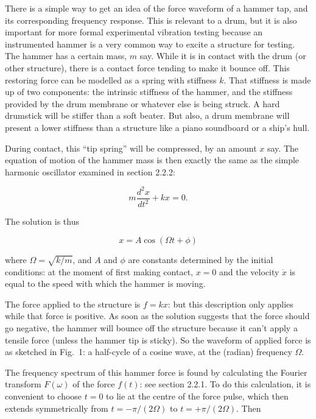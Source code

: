   There is a simple way to get an idea of the force waveform of a hammer tap, 
  and its corresponding frequency response. This is relevant to a drum, but it 
  is also important for more formal experimental vibration testing because an 
  instrumented hammer is a very common way to excite a structure for testing. 
  The hammer has a certain mass, $m$ say. While it is in contact with the drum 
  (or other structure), there is a contact force tending to make it bounce off. 
  This restoring force can be modelled as a spring with stiffness $k$. That 
  stiffness is made up of two components: the intrinsic stiffness of the 
  hammer, and the stiffness provided by the drum membrane or whatever else is 
  being struck. A hard drumstick will be stiffer than a soft beater. But also, 
  a drum membrane will present a lower stiffness than a structure like a piano 
  soundboard or a ship's hull. 

  During contact, this ``tip spring'' will be compressed, by an amount $x$ say. 
  The equation of motion of the hammer mass is then exactly the same as the 
  simple harmonic oscillator examined in section 2.2.2: 

  \begin{equation*}m \dfrac{d^2 x}{dt^2}+kx=0. \tag{1}\end{equation*} 

  The solution is thus 

  \begin{equation*}x=A \cos(\Omega t + \phi) \tag{2}\end{equation*} 

  \noindent{}where $\Omega=\sqrt{k/m}$, and $A$ and $\phi$ are constants 
  determined by the initial conditions: at the moment of first making contact, 
  $x=0$ and the velocity $\dot{x}$ is equal to the speed with which the hammer 
  is moving. 

  The force applied to the structure is $f=kx$: but this description only 
  applies while that force is positive. As soon as the solution suggests that 
  the force should go negative, the hammer will bounce off the structure 
  because it can't apply a tensile force (unless the hammer tip is sticky). So 
  the waveform of applied force is as sketched in Fig.\ 1: a half-cycle of a 
  cosine wave, at the (radian) frequency $\Omega$. 


  The frequency spectrum of this hammer force is found by calculating the 
  Fourier transform $F(\omega)$ of the force $f(t)$: see section 2.2.1. To do 
  this calculation, it is convenient to choose $t=0$ to lie at the centre of 
  the force pulse, which then extends symmetrically from $t=-\pi / (2 \Omega)$ 
  to $t=+\pi / (2 \Omega)$. Then 

